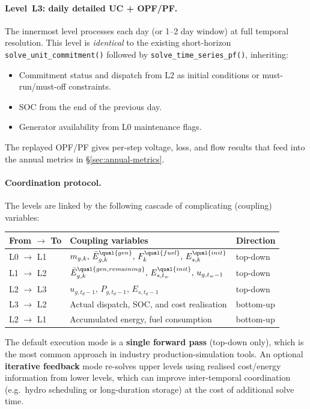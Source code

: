 \paragraph{Level~L3: daily detailed UC + OPF/PF.}
The innermost level processes each day (or 1--2 day window) at full temporal
resolution.  This level is \emph{identical} to the existing short-horizon
\texttt{solve\_unit\_commitment()} followed by
\texttt{solve\_time\_series\_pf()}, inheriting:
\begin{itemize}
\item Commitment status and dispatch from L2 as initial conditions or
  must-run/must-off constraints.
\item SOC from the end of the previous day.
\item Generator availability from L0 maintenance flags.
\end{itemize}
The replayed OPF/PF gives per-step voltage, loss, and flow results that
feed into the annual metrics in \S\ref{sec:annual-metrics}.

\paragraph{Coordination protocol.}
The levels are linked by the following cascade of complicating (coupling)
variables:

\begin{center}
\begin{tabular}{lll}
\toprule
From $\to$ To & Coupling variables & Direction \\
\midrule
L0 $\to$ L1 & \(m_{g,k},\, \bar E_{g,k}^{\qual{gen}},\,
               F_k^{\qual{fuel}},\, E_{s,k}^{\qual{init}}\) & top-down \\
L1 $\to$ L2 & \(\bar E_{g,k}^{\qual{gen,remaining}},\,
               E_{s,t_w}^{\qual{init}},\, u_{g,t_w{-}1}\) & top-down \\
L2 $\to$ L3 & \(u_{g,t_d{-}1},\, P_{g,t_d{-}1},\,
               E_{s,t_d{-}1}\) & top-down \\
L3 $\to$ L2 & Actual dispatch, SOC, and cost realisation & bottom-up \\
L2 $\to$ L1 & Accumulated energy, fuel consumption & bottom-up \\
\bottomrule
\end{tabular}
\end{center}

The default execution mode is a \textbf{single forward pass} (top-down only),
which is the most common approach in industry production-simulation tools.
An optional \textbf{iterative feedback} mode re-solves upper levels using
realised cost/energy information from lower levels, which can improve
inter-temporal coordination (e.g.\ hydro scheduling or long-duration storage)
at the cost of additional solve time.

